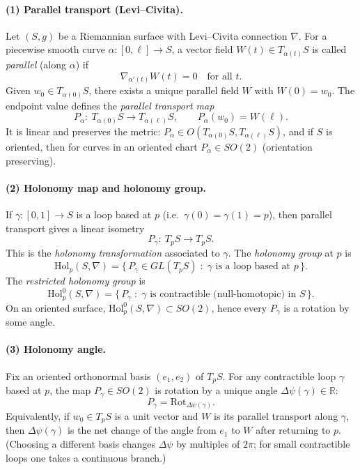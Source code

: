 \documentclass[12pt,a4paper]{article}
\theoremstyle{plain}
\theoremstyle{definition}      %
\begin{document}
	\paragraph{(1) Parallel transport (Levi--Civita).}
	Let $(S,g)$ be a Riemannian surface with Levi--Civita connection $\nabla$.
	For a piecewise smooth curve $\alpha:[0,\ell]\to S$, a vector field $W(t)\in T_{\alpha(t)}S$ is called \emph{parallel}
	(along $\alpha$) if
	\[
	\nabla_{\alpha'(t)}W(t)=0 \quad\text{for all }t.
	\]
	Given $w_0\in T_{\alpha(0)}S$, there exists a unique parallel field $W$ with $W(0)=w_0$.
	The endpoint value defines the \emph{parallel transport map}
	\[
	P_\alpha:\ T_{\alpha(0)}S\to T_{\alpha(\ell)}S,\qquad P_\alpha(w_0)=W(\ell).
	\]
	It is linear and preserves the metric: $P_\alpha\in O(T_{\alpha(0)}S,T_{\alpha(\ell)}S)$, and if $S$ is oriented, then
	for curves in an oriented chart $P_\alpha\in SO(2)$ (orientation preserving).
	
	\paragraph{(2) Holonomy map and holonomy group.}
	If $\gamma:[0,1]\to S$ is a loop based at $p$ (i.e.\ $\gamma(0)=\gamma(1)=p$), then parallel transport gives a linear isometry
	\[
	P_\gamma:\ T_pS\to T_pS.
	\]
	This is the \emph{holonomy transformation} associated to $\gamma$.
	The \emph{holonomy group} at $p$ is
	\[
	\mathrm{Hol}_p(S,\nabla)=\{\,P_\gamma\in GL(T_pS)\;:\;\gamma \text{ is a loop based at }p\,\}.
	\]
	The \emph{restricted holonomy group} is
	\[
	\mathrm{Hol}^0_p(S,\nabla)=\{\,P_\gamma\;:\;\gamma \text{ is contractible (null-homotopic) in }S\,\}.
	\]
	On an oriented surface, $\mathrm{Hol}^0_p(S,\nabla)\subset SO(2)$, hence every $P_\gamma$ is a rotation by some angle.
	
	\paragraph{(3) Holonomy angle.}
	Fix an oriented orthonormal basis $(e_1,e_2)$ of $T_pS$. For any contractible loop $\gamma$ based at $p$,
	the map $P_\gamma\in SO(2)$ is rotation by a unique angle $\Delta\psi(\gamma)\in\mathbb{R}$:
	\[
	P_\gamma=\mathrm{Rot}_{\Delta\psi(\gamma)}.
	\]
	Equivalently, if $w_0\in T_pS$ is a unit vector and $W$ is its parallel transport along $\gamma$, then
	$\Delta\psi(\gamma)$ is the net change of the angle from $e_1$ to $W$ after returning to $p$.
	(Choosing a different basis changes $\Delta\psi$ by multiples of $2\pi$; for small contractible loops one takes a continuous branch.)
	
\end{document}
